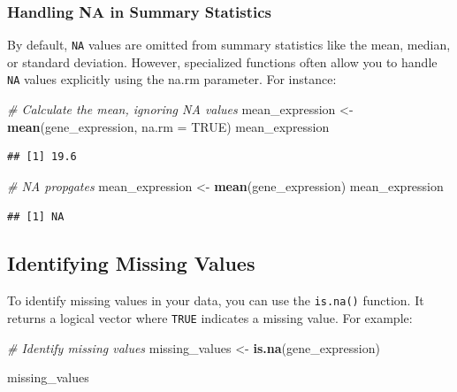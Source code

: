 \documentclass[
]{book}
\newenvironment{Shaded}{\begin{snugshade}}{\end{snugshade}}
\newcommand{\AttributeTok}[1]{\textcolor[rgb]{0.13,0.29,0.53}{#1}}
\newcommand{\CommentTok}[1]{\textcolor[rgb]{0.56,0.35,0.01}{\textit{#1}}}
\newcommand{\ConstantTok}[1]{\textcolor[rgb]{0.56,0.35,0.01}{#1}}
\newcommand{\FunctionTok}[1]{\textcolor[rgb]{0.13,0.29,0.53}{\textbf{#1}}}
\newcommand{\NormalTok}[1]{#1}
\newcommand{\OtherTok}[1]{\textcolor[rgb]{0.56,0.35,0.01}{#1}}
\begin{document}
\hypertarget{handling-na-in-summary-statistics}{%
\subsubsection{Handling NA in Summary Statistics}\label{handling-na-in-summary-statistics}}

By default, \texttt{NA} values are omitted from summary statistics like the mean, median, or standard deviation. However, specialized functions often allow you to handle \texttt{NA} values explicitly using the na.rm parameter. For instance:

\begin{Shaded}
\begin{Highlighting}[]
\CommentTok{\# Calculate the mean, ignoring NA values}
\NormalTok{mean\_expression }\OtherTok{\textless{}{-}} \FunctionTok{mean}\NormalTok{(gene\_expression, }\AttributeTok{na.rm =} \ConstantTok{TRUE}\NormalTok{)}
\NormalTok{mean\_expression}
\end{Highlighting}
\end{Shaded}

\begin{verbatim}
## [1] 19.6
\end{verbatim}

\begin{Shaded}
\begin{Highlighting}[]
\CommentTok{\# NA propgates}
\NormalTok{mean\_expression }\OtherTok{\textless{}{-}} \FunctionTok{mean}\NormalTok{(gene\_expression)}
\NormalTok{mean\_expression}
\end{Highlighting}
\end{Shaded}

\begin{verbatim}
## [1] NA
\end{verbatim}

\hypertarget{identifying-missing-values}{%
\subsection{Identifying Missing Values}\label{identifying-missing-values}}

To identify missing values in your data, you can use the \texttt{is.na()} function. It returns a logical vector where \texttt{TRUE} indicates a missing value. For example:

\begin{Shaded}
\begin{Highlighting}[]
\CommentTok{\# Identify missing values}
\NormalTok{missing\_values }\OtherTok{\textless{}{-}} \FunctionTok{is.na}\NormalTok{(gene\_expression)}

\NormalTok{missing\_values}
\end{Highlighting}
\end{Shaded}
\end{document}
